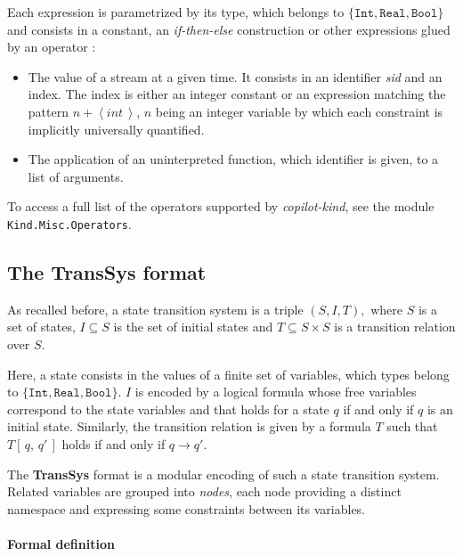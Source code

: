 \medskip

Each expression is parametrized by its type, which belongs to $\{ \texttt{Int}, \texttt{Real},  \texttt{Bool}\}$ and consists in a constant, an \textit{if-then-else} construction or other expressions glued by an operator :

\begin{itemize}
\item The value of a stream at a given time. It consists in an identifier \textit{sid} and an index. The index is either an integer constant or an expression matching the pattern $ \textit{n} +  \left< \textit{int} \,  \right> $, $n$ being an integer variable by which each constraint is implicitly universally quantified.

\item The application of an uninterpreted function, which identifier is given, to a list of arguments.
\end{itemize}
To access a full list of the operators supported by \textit{copilot-kind}, see the module \texttt{Kind.Misc.Operators}.

\subsection{The \textbf{TransSys} format}

As recalled before, a state transition system is a triple $(S,I,T),$
where $S$ is a set of states, $I \subseteq S$ is the set of initial
states and $T \subseteq S \times S $ is a transition relation over $S$.


Here, a state consists in the values of a finite set of variables, which types belong to $\{ \texttt{Int}, \texttt{Real},  \texttt{Bool}\}$. $I$ is encoded by a logical formula whose free variables correspond to the state variables and that holds for a state $q$ if and only if $q$ is an initial state. Similarly, the transition relation is given by a formula $T$ such that $T\left[\, q, \, q' \,\right]$ holds if and only if $q \rightarrow q'$. 


The \textbf{TransSys} format is a modular encoding of such a state transition system. Related variables are grouped into \textit{nodes}, each node providing a distinct namespace and expressing some constraints between its variables. 



\paragraph{Formal definition}

